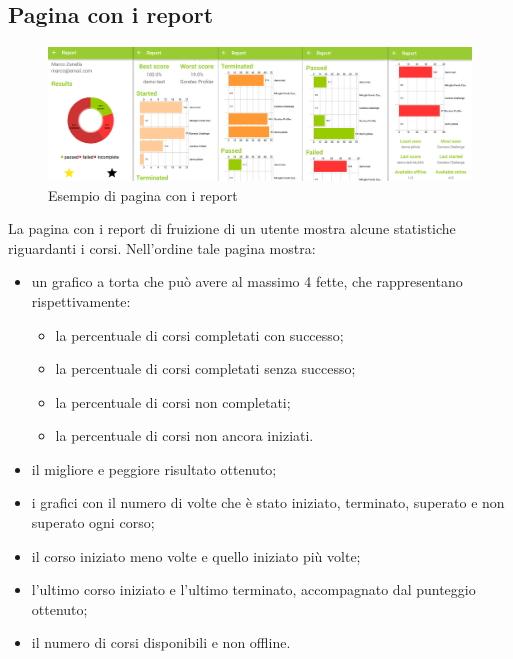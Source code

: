 	\subsection{Pagina con i report}
	\begin{figure}[H]
		\centering
		\includegraphics[scale=0.1]{images/prodotto_finale/report_tot}
			\caption{Esempio di pagina con i report}
	\end{figure}
	La pagina con i report di fruizione di un utente mostra alcune statistiche riguardanti i corsi. Nell'ordine tale pagina mostra:
	\begin{itemize}
		\item un grafico a torta che può avere al massimo 4 fette, che rappresentano rispettivamente:
			\begin{itemize}
				\item la percentuale di corsi completati con successo;
				\item la percentuale di corsi completati senza successo;
				\item la percentuale di corsi non completati;
				\item la percentuale di corsi non ancora iniziati.
			\end{itemize}
		\item il migliore e peggiore risultato ottenuto;
		\item i grafici con il numero di volte che è stato iniziato, terminato, superato e non superato ogni corso;
		\item il corso iniziato meno volte e quello iniziato più volte;
		\item l'ultimo corso iniziato e l'ultimo terminato, accompagnato dal punteggio ottenuto;
		\item il numero di corsi disponibili e non offline.
	\end{itemize}

	\newpage
